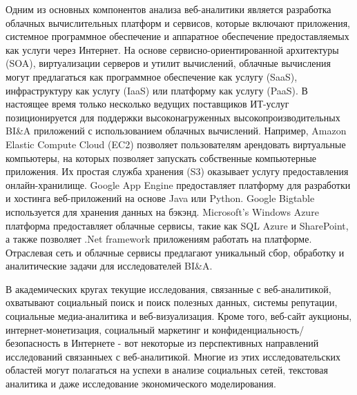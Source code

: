Одним из основных компонентов анализа веб-аналитики является
разработка облачных вычислительных платформ и сервисов,
которые включают приложения, системное программное обеспечение и аппаратное обеспечение
предоставляемых как услуги через Интернет. На основе сервисно-ориентированной
архитектуры (SOA), виртуализации серверов и утилит
вычислений, облачные вычисления могут предлагаться как программное обеспечение как услугу (SaaS), инфраструктуру как услугу (IaaS) или платформу
как услугу (PaaS). В настоящее время только несколько ведущих поставщиков ИТ-услуг
позиционируется для поддержки высоконагруженных высокопроизводительных BI\&A
приложений с использованием облачных вычислений. Например, Amazon
Elastic Compute Cloud (EC2) позволяет пользователям арендовать виртуальные
компьютеры, на которых позволяет запускать собственные компьютерные приложения.
Их простая служба хранения (S3) оказывает услугу предоставления онлайн-хранилище. Google App Engine предоставляет платформу для разработки
и хостинга веб-приложений на основе Java или Python.
Google Bigtable используется для хранения данных на бэкэнд. Microsoft's Windows Azure платформа предоставляет облачные сервисы, такие как
SQL Azure и SharePoint, а также позволяет .Net framework
приложениям работать на платформе. Отраслевая сеть и
облачные сервисы предлагают уникальный сбор, обработку и
аналитические задачи для исследователей BI\&A.

В академических кругах текущие исследования, связанные с веб-аналитикой, охватывают
социальный поиск и поиск полезных данных, системы репутации, социальные
медиа-аналитика и веб-визуализация. Кроме того, веб-сайт
аукционы, интернет-монетизация, социальный маркетинг и
конфиденциальность/безопасность в Интернете - вот некоторые из перспективных направлений исследований связанныех с веб-аналитикой. Многие из этих
исследовательских областей могут полагаться на успехи в анализе социальных сетей,
текстовая аналитика и даже исследование экономического моделирования.
